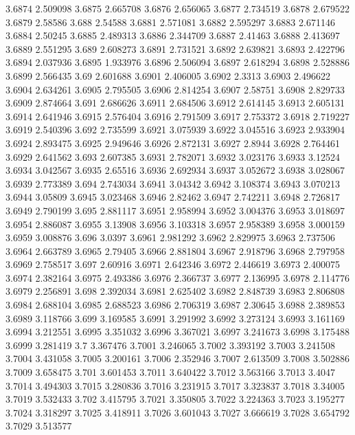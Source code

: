 3.6874  2.509098
3.6875  2.665708
3.6876  2.656065
3.6877  2.734519
3.6878  2.679522
3.6879  2.58586
3.688  2.54588
3.6881  2.571081
3.6882  2.595297
3.6883  2.671146
3.6884  2.50245
3.6885  2.489313
3.6886  2.344709
3.6887  2.41463
3.6888  2.413697
3.6889  2.551295
3.689  2.608273
3.6891  2.731521
3.6892  2.639821
3.6893  2.422796
3.6894  2.037936
3.6895  1.933976
3.6896  2.506094
3.6897  2.618294
3.6898  2.528886
3.6899  2.566435
3.69  2.601688
3.6901  2.406005
3.6902  2.3313
3.6903  2.496622
3.6904  2.634261
3.6905  2.795505
3.6906  2.814254
3.6907  2.58751
3.6908  2.829733
3.6909  2.874664
3.691  2.686626
3.6911  2.684506
3.6912  2.614145
3.6913  2.605131
3.6914  2.641946
3.6915  2.576404
3.6916  2.791509
3.6917  2.753372
3.6918  2.719227
3.6919  2.540396
3.692  2.735599
3.6921  3.075939
3.6922  3.045516
3.6923  2.933904
3.6924  2.893475
3.6925  2.949646
3.6926  2.872131
3.6927  2.8944
3.6928  2.764461
3.6929  2.641562
3.693  2.607385
3.6931  2.782071
3.6932  3.023176
3.6933  3.12524
3.6934  3.042567
3.6935  2.65516
3.6936  2.692934
3.6937  3.052672
3.6938  3.028067
3.6939  2.773389
3.694  2.743034
3.6941  3.04342
3.6942  3.108374
3.6943  3.070213
3.6944  3.05809
3.6945  3.023468
3.6946  2.82462
3.6947  2.742211
3.6948  2.726817
3.6949  2.790199
3.695  2.881117
3.6951  2.958994
3.6952  3.004376
3.6953  3.018697
3.6954  2.886087
3.6955  3.13908
3.6956  3.103318
3.6957  2.958389
3.6958  3.000159
3.6959  3.008876
3.696  3.0397
3.6961  2.981292
3.6962  2.829975
3.6963  2.737506
3.6964  2.663789
3.6965  2.79405
3.6966  2.881804
3.6967  2.918796
3.6968  2.797958
3.6969  2.758517
3.697  2.60916
3.6971  2.642346
3.6972  2.446619
3.6973  2.400075
3.6974  2.382164
3.6975  2.493386
3.6976  2.366737
3.6977  2.136995
3.6978  2.114776
3.6979  2.256891
3.698  2.392034
3.6981  2.625402
3.6982  2.848739
3.6983  2.806808
3.6984  2.688104
3.6985  2.688523
3.6986  2.706319
3.6987  2.30645
3.6988  2.389853
3.6989  3.118766
3.699  3.169585
3.6991  3.291992
3.6992  3.273124
3.6993  3.161169
3.6994  3.212551
3.6995  3.351032
3.6996  3.367021
3.6997  3.241673
3.6998  3.175488
3.6999  3.281419
3.7  3.367476
3.7001  3.246065
3.7002  3.393192
3.7003  3.241508
3.7004  3.431058
3.7005  3.200161
3.7006  2.352946
3.7007  2.613509
3.7008  3.502886
3.7009  3.658475
3.701  3.601453
3.7011  3.640422
3.7012  3.563166
3.7013  3.4047
3.7014  3.494303
3.7015  3.280836
3.7016  3.231915
3.7017  3.323837
3.7018  3.34005
3.7019  3.532433
3.702  3.415795
3.7021  3.350805
3.7022  3.224363
3.7023  3.195277
3.7024  3.318297
3.7025  3.418911
3.7026  3.601043
3.7027  3.666619
3.7028  3.654792
3.7029  3.513577
